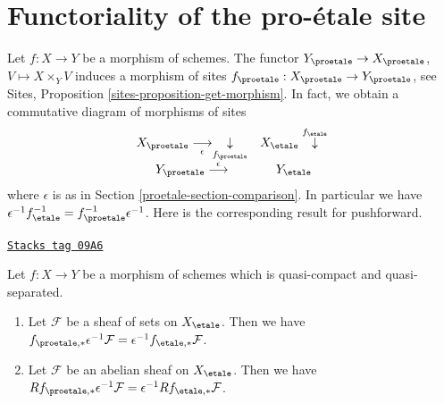 \section{Functoriality of the pro-\'etale site}
\label{proetale-section-morphism}
Let $f : X \to Y$ be a morphism of schemes. The functor
$Y_\proetale \to X_\proetale$, $V \mapsto X \times_Y V$
induces a morphism of sites $f_\proetale : X_\proetale \to Y_\proetale$, see
Sites, Proposition \ref{sites-proposition-get-morphism}.
In fact, we obtain a commutative diagram of morphisms of sites
$$
\begin{array}{cc}X_\proetale \underset{\epsilon}{\longrightarrow}\underset{f_\proetale}{\downarrow} & X_\etale \overset{f_\etale}{\downarrow} \\ Y_\proetale \overset{\epsilon}{\longrightarrow} & Y_\etale\end{array}
$$
where $\epsilon$ is as in Section \ref{proetale-section-comparison}.
In particular we have
$\epsilon^{-1} f_\etale^{-1} = f_\proetale^{-1} \epsilon^{-1}$.
Here is the corresponding result for pushforward.

\begin{lemma}
\label{proetale-lemma-morphism-comparison}
\href{https://stacks.math.columbia.edu/tag/09A6}{\texttt{Stacks tag 09A6}}

Let $f : X \to Y$ be a morphism of schemes which is quasi-compact and
quasi-separated.
\begin{enumerate}
\item Let $\mathcal{F}$ be a sheaf of sets on $X_\etale$. Then we have
$f_{\proetale, *}\epsilon^{-1}\mathcal{F} =
\epsilon^{-1}f_{\etale, *}\mathcal{F}$.
\item Let $\mathcal{F}$ be an abelian sheaf on $X_\etale$. Then we have
$Rf_{\proetale, *}\epsilon^{-1}\mathcal{F} =
\epsilon^{-1}Rf_{\etale, *}\mathcal{F}$.
\end{enumerate}
\end{lemma}

